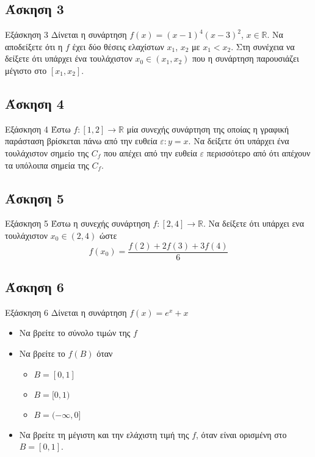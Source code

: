\documentclass[greek]{beamer}
\begin{document}
\subsection{Άσκηση 3}
\begin{frame}[label=Άσκηση3]{Εξάσκηση 3}
      Δίνεται η συνάρτηση $f(x)=(x-1)^4(x-3)^2$, $x\in \mathbb{R}$. Να αποδείξετε ότι η $f$ έχει δύο θέσεις ελαχίστων $x_1$, $x_2$ με $x_1<x_2$. Στη συνέχεια να δείξετε ότι υπάρχει ένα τουλάχιστον $x_0\in (x_1,x_2)$ που η συνάρτηση παρουσιάζει μέγιστο στο $[x_1,x_2]$.

      \hyperlink{Λύση3}{}
\end{frame}

\subsection{Άσκηση 4}
\begin{frame}[label=Άσκηση4]{Εξάσκηση 4}
      Έστω $f:[1,2]\to\mathbb{R}$ μία συνεχής συνάρτηση της οποίας η γραφική παράσταση βρίσκεται πάνω από την ευθεία $ε:y=x$. Να δείξετε ότι υπάρχει ένα τουλάχιστον σημείο της $C_f$ που απέχει από την ευθεία $ε$ περισσότερο από ότι απέχουν τα υπόλοιπα σημεία της $C_f$.

      \hyperlink{Λύση4}{}
\end{frame}

\subsection{Άσκηση 5}
\begin{frame}[label=Άσκηση5]{Εξάσκηση 5}
      Έστω η συνεχής συνάρτηση $f:[2,4]\to\mathbb{R}$. Να δείξετε ότι υπάρχει ενα τουλάχιστον $x_0\in (2,4)$ ώστε
      $$f(x_0)=\frac{f(2)+2f(3)+3f(4)}{6}$$

      \hyperlink{Λύση5}{}
\end{frame}

\subsection{Άσκηση 6}
\begin{frame}[label=Άσκηση6]{Εξάσκηση 6}
      Δίνεται η συνάρτηση $f(x)=e^x+x$
      \begin{itemize}
            \item<1-> Να βρείτε το σύνολο τιμών της $f$
            \item<2-> Να βρείτε το $f(Β)$ όταν
                  \begin{itemize}
                        \item<3-> $Β=[0,1]$
                        \item<4-> $Β=[0,1)$
                        \item<5-> $Β=(-\infty,0]$
                  \end{itemize}
            \item<6-> Να βρείτε τη μέγιστη και την ελάχιστη τιμή της $f$, όταν είναι ορισμένη στο $Β=[0,1]$.
      \end{itemize}

      \hyperlink{Λύση6}{}
\end{frame}
\end{document}
